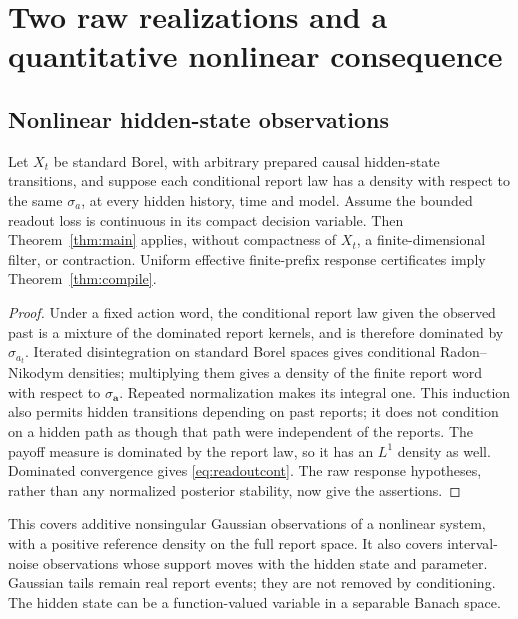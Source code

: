 \section{Two raw realizations and a quantitative nonlinear consequence}\label{sec:models}
\subsection{Nonlinear hidden-state observations}
\begin{theorem}\label{thm:hidden}
Let $X_t$ be standard Borel, with arbitrary prepared causal hidden-state transitions, and suppose each conditional report law has a density with respect to the same $\sigma_a$, at every hidden history, time and model. Assume the bounded readout loss is continuous in its compact decision variable. Then Theorem~\ref{thm:main} applies, without compactness of $X_t$, a finite-dimensional filter, or contraction. Uniform effective finite-prefix response certificates imply Theorem~\ref{thm:compile}.
\end{theorem}
\begin{proof}
Under a fixed action word, the conditional report law given the observed past is a mixture of the dominated report kernels, and is therefore dominated by $\sigma_{a_t}$. Iterated disintegration on standard Borel spaces gives conditional Radon--Nikodym densities; multiplying them gives a density of the finite report word with respect to $\sigma_{\mathbf a}$. Repeated normalization makes its integral one. This induction also permits hidden transitions depending on past reports; it does not condition on a hidden path as though that path were independent of the reports. The payoff measure is dominated by the report law, so it has an $L^1$ density as well. Dominated convergence gives \eqref{eq:readoutcont}. The raw response hypotheses, rather than any normalized posterior stability, now give the assertions.
\end{proof}
This covers additive nonsingular Gaussian observations of a nonlinear system, with a positive reference density on the full report space. It also covers interval-noise observations whose support moves with the hidden state and parameter. Gaussian tails remain real report events; they are not removed by conditioning. The hidden state can be a function-valued variable in a separable Banach space.

